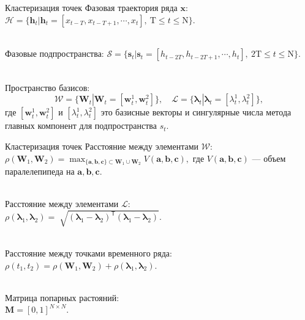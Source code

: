 \documentclass{beamer}
\begin{document}
\begin{frame}{Кластеризация точек}
Фазовая траектория ряда $\textbf{x}$:
$\mathcal{H} = \{\textbf{h}_t| \textbf{h}_t = [x_{t-T}, x_{t-T+1}, \cdots, x_{t}],~\text{T}\leq t\leq \text{N}\}.$

~\\
Фазовые подпространства:
$\mathcal{S} = \{\textbf{s}_t| \textbf{s}_t = [h_{t-2T}, h_{t-2T+1}, \cdots, h_{t}],~\text{2T}\leq t\leq \text{N}\}.$

~\\
Пространство базисов:
$$\mathcal{W} = \{\textbf{W}_{t}| \textbf{W}_t = [\textbf{w}^1_t, \textbf{w}^2_t]\}, \quad \mathcal{L} = \{\bm{\lambda}_t| \bm{\lambda}_t=[\lambda^1_t, \lambda^2_t]\}, $$
где $[\textbf{w}^1_t, \textbf{w}^2_t]$ и $[\lambda^1_t, \lambda^2_t]$ это базисные векторы и сингулярные числа метода главных компонент для подпространства $s_t$.
\end{frame}
\begin{frame}{Кластеризация точек}
Расстояние между элементами $\mathcal{W}$:\\
$\rho\left(\textbf{W}_1, \textbf{W}_2\right) = \max_{\{\textbf{a},\textbf{b},\textbf{c}\} \subset \textbf{W}_1\cup \textbf{W}_2 } V\left(\textbf{a},\textbf{b},\textbf{c}\right),$
где $V\left(\textbf{a},\textbf{b},\textbf{c}\right)$ --- объем паралелепипеда на $\textbf{a}, \textbf{b}, \textbf{c}$.

~\\
Расстояние между элементами $\mathcal{L}$:\\
$\rho\left(\bm{\lambda}_1, \bm{\lambda}_2\right) = \sqrt[]{\left(\bm{\lambda}_1 - \bm{\lambda}_2\right)^{\mathsf{T}}\left(\bm{\lambda}_1 - \bm{\lambda}_2\right)}.$

~\\
Расстояние между точками временного ряда:\\
$\rho\left(t_1, t_2\right) = \rho\left(\textbf{W}_1, \textbf{W}_2\right) + \rho\left(\bm{\lambda}_1, \bm{\lambda}_2\right).$

~\\
Матрица попарных растояний:\\
$\textbf{M} = [0, 1]^{N\times N}.$

\end{frame}
\end{document}
